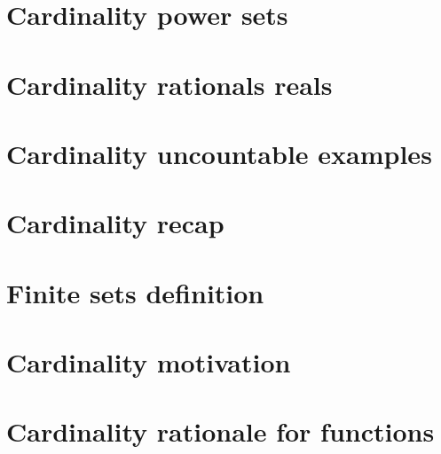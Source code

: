 
\section*{Cardinality power sets}

\vfill
\section*{Cardinality rationals reals}

\vfill
\section*{Cardinality uncountable examples}

\vfill
\section*{Cardinality recap}

\vfill
\section*{Finite sets definition}

\vfill
\section*{Cardinality motivation}

\vfill
\section*{Cardinality rationale for functions}

\vfill
